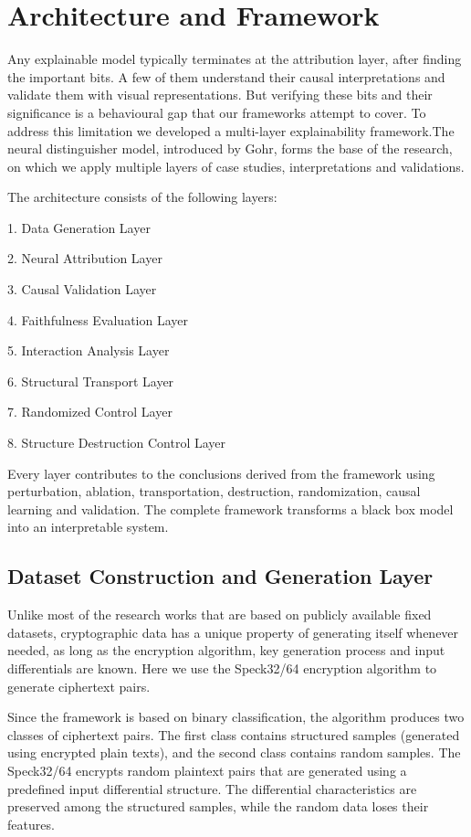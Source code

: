 \section{Architecture and Framework}


Any explainable model typically terminates at the attribution layer, after finding the important 
bits. A few of them understand their causal interpretations and validate them with visual 
representations. But verifying these bits and their significance is a behavioural gap that our 
frameworks attempt to cover. To address this limitation we developed a multi-layer 
explainability framework.The neural distinguisher model, introduced by Gohr, forms the base of 
the research, on which we apply multiple layers of case studies, interpretations and validations. 

The architecture consists of the following layers: 

1.  Data Generation Layer 

2.  Neural Attribution Layer 

3.  Causal Validation Layer 

4.  Faithfulness Evaluation Layer 

5.  Interaction Analysis Layer 

6.  Structural Transport Layer 

7.  Randomized Control Layer 

8.  Structure Destruction Control Layer 

Every layer contributes to the conclusions derived from the framework using perturbation, 
ablation, transportation, destruction, randomization, causal learning and validation. The complete 
framework transforms a black box model into an interpretable system. 

\subsection{Dataset Construction and Generation Layer}

Unlike most of the research works that are based on publicly available fixed datasets, 
cryptographic data has a unique property of generating itself whenever needed, as long as the 
encryption algorithm, key generation process and input differentials are known. Here we use the 
Speck32/64 encryption algorithm to generate ciphertext pairs.  

Since the framework is based on binary classification, the algorithm produces two classes of 
ciphertext pairs. The first class contains structured samples (generated using encrypted plain 
texts), and the second class contains random samples. The Speck32/64 encrypts random plaintext 
pairs that are generated using a predefined input differential structure. The differential 
characteristics are preserved among the structured samples, while the random data loses their 
features. 


